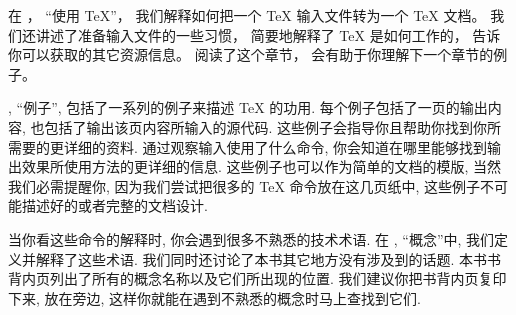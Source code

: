 在 ， ``使用 \TeX''，
我们解释如何把一个 \TeX{} 输入文件转为一个 \TeX{} 文档。
我们还讲述了准备输入文件的一些习惯，
简要地解释了 \TeX{} 是如何工作的， 告诉你可以获取的其它资源信息。
阅读了这个章节， 会有助于你理解下一个章节的例子。


, ``例子'',
包括了一系列的例子来描述 \TeX{} 的功用.
每个例子包括了一页的输出内容, 也包括了输出该页内容所输入的源代码.
这些例子会指导你且帮助你找到你所需要的更详细的资料.
通过观察输入使用了什么命令,
你会知道在哪里能够找到输出效果所使用方法的更详细的信息.
这些例子也可以作为简单的文档的模版, 当然我们必需提醒你,
因为我们尝试把很多的 \TeX{} 命令放在这几页纸中,
这些例子不可能描述好的或者完整的文档设计.


当你看这些命令的解释时, 你会遇到很多不熟悉的技术术语.
在 , ``概念''中, 我们定义并解释了这些术语.
我们同时还讨论了本书其它地方没有涉及到的话题.
本书书背内页列出了所有的概念名称以及它们所出现的位置.
我们建议你把书背内页复印下来, 放在旁边,
这样你就能在遇到不熟悉的概念时马上查找到它们.


